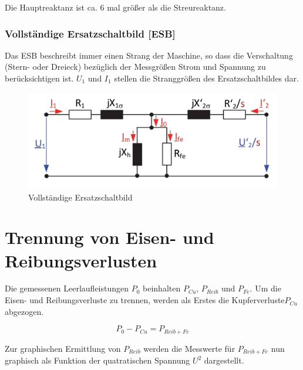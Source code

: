 \documentclass[conference]{IEEEtran}
\begin{document}
Die Hauptreaktanz ist ca. 6 mal größer als die Streureaktanz.

\subsubsection{Vollständige Ersatzschaltbild [ESB]}

Das ESB beschreibt immer einen Strang der Maschine, so dass die Verschaltung
(Stern- oder Dreieck) bezüglich der Messgrößen Strom und Spannung zu
berücksichtigen ist. $U_1$ und $I_1$ stellen die Stranggrößen des
Ersatzschaltbildes dar.

\begin{figure}[htbp]
    \centering
    \includegraphics[width=\columnwidth]{./figures/Vollstaendiges_ESB.jpg}
    \caption{Vollständige Ersatzschaltbild}
    \label{fig:ESB_Vollstaendig}
\end{figure}

\section{Trennung von Eisen- und Reibungsverlusten}

Die gemessenen Leerlaufleistungen $P_{0}$ beinhalten $P_{Cu}$, $P_{Reib}$ und
$P_{Fe}$. Um die Eisen- und Reibungsverluste zu trennen, werden als Erstes die
Kupferverluste$ P_{Cu}$ abgezogen.

\begin{equation}
    P_{0} - P_{Cu} = P_{Reib+Fe}
    \label{eq:P_reib_fe}
\end{equation}



Zur graphischen Ermittlung von $P_{Reib}$ werden die Messwerte für
$P_{Reib+Fe}$ nun graphisch als Funktion der quatratischen Spannung $U^2$
dargestellt.
\end{document}
